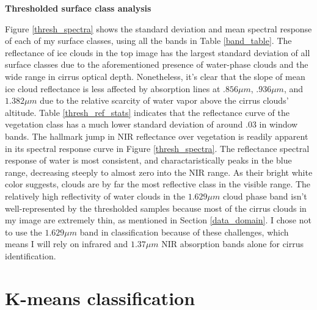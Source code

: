 \documentclass[12pt]{article}
\begin{document}
\noindent
\textbf{Thresholded surface class analysis}

Figure \ref{thresh_spectra} shows the standard deviation and mean spectral response of each of my surface classes, using all the bands in Table \ref{band_table}. The reflectance of ice clouds in the top image has the largest standard deviation of all surface classes due to the aforementioned presence of water-phase clouds and the wide range in cirrus optical depth. Nonetheless, it's clear that the slope of mean ice cloud reflectance is less affected by absorption lines at $.856\mu m$, $.936\mu m$, and $1.382\mu m$ due to the relative scarcity of water vapor above the cirrus clouds' altitude. Table \ref{thresh_ref_stats} indicates that the reflectance curve of the vegetation class has a much lower standard deviation of around $.03$ in window bands. The hallmark jump in NIR reflectance over vegetation is readily apparent in its spectral response curve in Figure \ref{thresh_spectra}. The reflectance spectral response of water is most consistent, and charactaristically peaks in the blue range, decreasing steeply to almost zero into the NIR range. As their bright white color suggests, clouds are by far the most reflective class in the visible range. The relatively high reflectivity of water clouds in the $1.629\mu m$ cloud phase band isn't well-represented by the thresholded samples because most of the cirrus clouds in my image are extremely thin, as mentioned in Section \ref{data_domain}. I chose not to use the $1.629\mu m$ band in classification because of these challenges, which means I will rely on infrared and $1.37\mu m$ NIR absorption bands alone for cirrus identification.

\clearpage

\section{K-means classification}\label{section_km}
\end{document}
